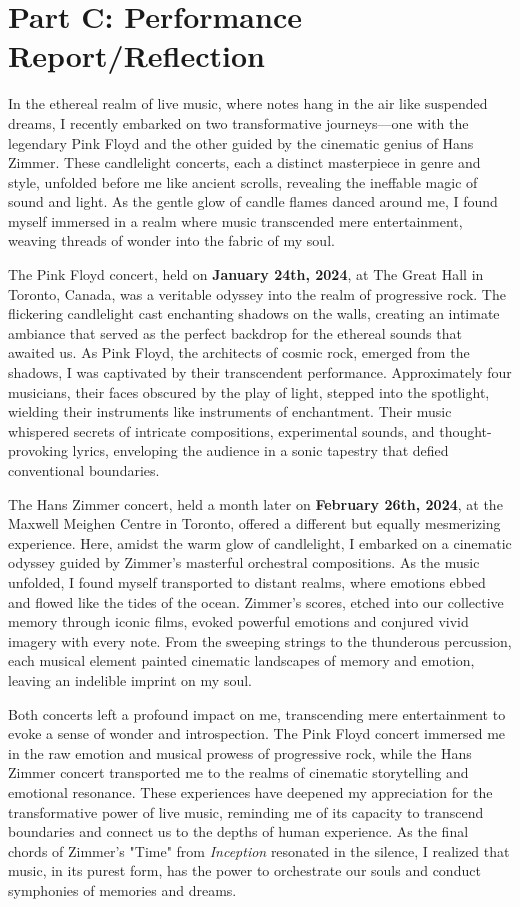 \section{Part C: Performance Report/Reflection}

In the ethereal realm of live music, where notes hang in the air like suspended dreams, I recently embarked on two transformative journeys—one with the legendary Pink Floyd and the other guided by the cinematic genius of Hans Zimmer. These candlelight concerts, each a distinct masterpiece in genre and style, unfolded before me like ancient scrolls, revealing the ineffable magic of sound and light. As the gentle glow of candle flames danced around me, I found myself immersed in a realm where music transcended mere entertainment, weaving threads of wonder into the fabric of my soul.

The Pink Floyd concert, held on \textbf{January 24th, 2024}, at The Great Hall in Toronto, Canada, was a veritable odyssey into the realm of progressive rock. The flickering candlelight cast enchanting shadows on the walls, creating an intimate ambiance that served as the perfect backdrop for the ethereal sounds that awaited us. As Pink Floyd, the architects of cosmic rock, emerged from the shadows, I was captivated by their transcendent performance. Approximately four musicians, their faces obscured by the play of light, stepped into the spotlight, wielding their instruments like instruments of enchantment. Their music whispered secrets of intricate compositions, experimental sounds, and thought-provoking lyrics, enveloping the audience in a sonic tapestry that defied conventional boundaries.

The Hans Zimmer concert, held a month later on \textbf{February 26th, 2024}, at the Maxwell Meighen Centre in Toronto, offered a different but equally mesmerizing experience. Here, amidst the warm glow of candlelight, I embarked on a cinematic odyssey guided by Zimmer's masterful orchestral compositions. As the music unfolded, I found myself transported to distant realms, where emotions ebbed and flowed like the tides of the ocean. Zimmer's scores, etched into our collective memory through iconic films, evoked powerful emotions and conjured vivid imagery with every note. From the sweeping strings to the thunderous percussion, each musical element painted cinematic landscapes of memory and emotion, leaving an indelible imprint on my soul.

Both concerts left a profound impact on me, transcending mere entertainment to evoke a sense of wonder and introspection. The Pink Floyd concert immersed me in the raw emotion and musical prowess of progressive rock, while the Hans Zimmer concert transported me to the realms of cinematic storytelling and emotional resonance. These experiences have deepened my appreciation for the transformative power of live music, reminding me of its capacity to transcend boundaries and connect us to the depths of human experience. As the final chords of Zimmer's "Time" from \textit{Inception} resonated in the silence, I realized that music, in its purest form, has the power to orchestrate our souls and conduct symphonies of memories and dreams.

